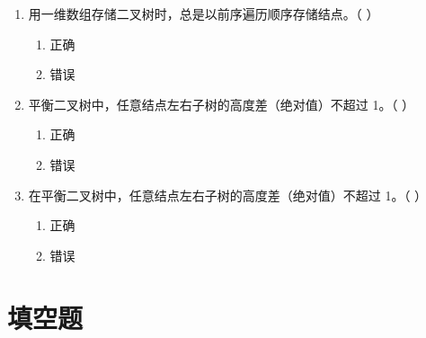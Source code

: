 \documentclass[12pt, a4paper]{article}
\begin{document}
\begin{enumerate}[label=\arabic*.]
	\item 用一维数组存储二叉树时，总是以前序遍历顺序存储结点。（ ）
	      \begin{enumerate}
		      \item[A.] 正确
		      \item[B.] 错误
	      \end{enumerate}

	\item 平衡二叉树中，任意结点左右子树的高度差（绝对值）不超过 1。（ ）
	      \begin{enumerate}
		      \item[A.] 正确
		      \item[B.] 错误
	      \end{enumerate}

	\item 在平衡二叉树中，任意结点左右子树的高度差（绝对值）不超过 1。（ ）
	      \begin{enumerate}
		      \item[A.] 正确
		      \item[B.] 错误
	      \end{enumerate}
\end{enumerate}

\section*{填空题}
\end{document}
